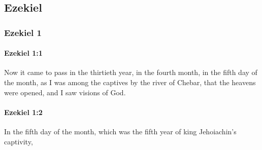 \subsection{Ezekiel}
	\label{EZEKIEL}

	\subsubsection{Ezekiel 1} %
		\label{EZEKIEL-1}

		\paragraph{Ezekiel 1:1} %
			\label{EZEKIEL-1-1}

			Now it came to pass in the thirtieth year, in the fourth month, in the fifth day of the month, as I was among the captives by the river of Chebar, that the heavens were opened, and I saw visions of God.


		\paragraph{Ezekiel 1:2} %
			\label{EZEKIEL-1-2}

			In the fifth day of the month, which was the fifth year of king Jehoiachin’s captivity,

